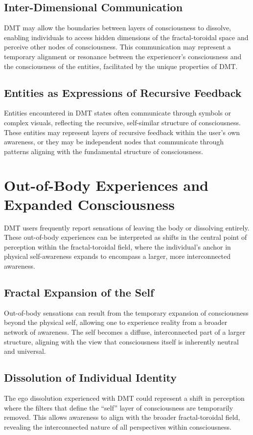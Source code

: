 \documentclass{article}
\begin{document}
\subsection{Inter-Dimensional Communication}
DMT may allow the boundaries between layers of consciousness to dissolve, enabling individuals to access hidden dimensions of the fractal-toroidal space and perceive other nodes of consciousness. This communication may represent a temporary alignment or resonance between the experiencer’s consciousness and the consciousness of the entities, facilitated by the unique properties of DMT.

\subsection{Entities as Expressions of Recursive Feedback}
Entities encountered in DMT states often communicate through symbols or complex visuals, reflecting the recursive, self-similar structure of consciousness. These entities may represent layers of recursive feedback within the user’s own awareness, or they may be independent nodes that communicate through patterns aligning with the fundamental structure of consciousness.

\section{Out-of-Body Experiences and Expanded Consciousness}
DMT users frequently report sensations of leaving the body or dissolving entirely. These out-of-body experiences can be interpreted as shifts in the central point of perception within the fractal-toroidal field, where the individual’s anchor in physical self-awareness expands to encompass a larger, more interconnected awareness.

\subsection{Fractal Expansion of the Self}
Out-of-body sensations can result from the temporary expansion of consciousness beyond the physical self, allowing one to experience reality from a broader network of awareness. The self becomes a diffuse, interconnected part of a larger structure, aligning with the view that consciousness itself is inherently neutral and universal.

\subsection{Dissolution of Individual Identity}
The ego dissolution experienced with DMT could represent a shift in perception where the filters that define the “self” layer of consciousness are temporarily removed. This allows awareness to align with the broader fractal-toroidal field, revealing the interconnected nature of all perspectives within consciousness.
\end{document}
